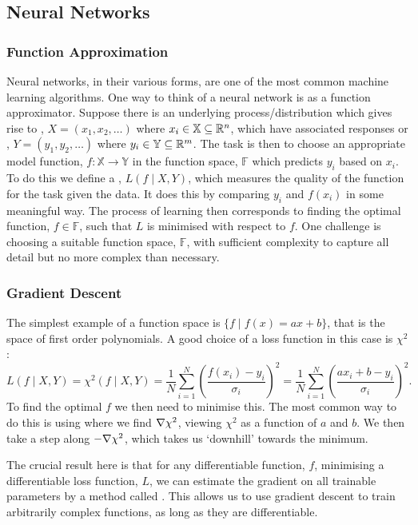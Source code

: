 \documentclass[a4paper]{article}
\newcommand{\st}{\mid}
\begin{document}
    \subsection{Neural Networks}
    \subsubsection{Function Approximation}
    Neural networks, in their various forms, are one of the most common machine learning algorithms.
    One way to think of a neural network is as a function approximator.
    Suppose there is an underlying process/distribution which gives rise to , \(X = (x_1, x_2, \dotsc)\) where \(x_i\in\mathbb{X}\subseteq\mathbb{R}^n\), which have associated responses or , \(Y = (y_1, y_2, \dotsc)\) where \(y_i \in \mathbb{Y} \subseteq \mathbb{R}^m\).
    The task is then to choose an appropriate model function, \(f\colon\mathbb{X} \to \mathbb{Y}\) in the function space, \(\mathbb{F}\) which predicts \(y_i\) based on \(x_i\).
    To do this we define a , \(L(f\st X, Y)\), which measures the quality of the function for the task given the data.
    It does this by comparing \(y_i\) and \(f(x_i)\) in some meaningful way.
    The process of learning then corresponds to finding the optimal function, \(f\in\mathbb{F}\), such that \(L\) is minimised with respect to \(f\).
    One challenge is choosing a suitable function space, \(\mathbb{F}\), with sufficient complexity to capture all detail but no more complex than necessary.
    
    \subsubsection{Gradient Descent}
    The simplest example of a function space is \(\{f\st f(x) = ax + b\}\), that is the space of first order polynomials.
    A good choice of a loss function in this case is \(\chi^2\):
    \[L(f\st X, Y) = \chi^2(f\st X, Y) = \frac{1}{N} \sum_{i = 1}^{N} \left(\frac{f(x_i) - y_i}{\sigma_i}\right)^2 = \frac{1}{N} \sum_{i = 1}^{N} \left(\frac{ax_i + b - y_i}{\sigma_i}\right)^2.\]
    To find the optimal \(f\) we then need to minimise this.
    The most common way to do this is using  where we find \(\nabla\chi^2\), viewing \(\chi^2\) as a function of \(a\) and \(b\).
    We then take a step along \(-\nabla\chi^2\), which takes us `downhill' towards the minimum.
    
    The crucial result here is that for any differentiable function, \(f\), minimising a differentiable loss function, \(L\), we can estimate the gradient on all trainable parameters by a method called .
    This allows us to use gradient descent to train arbitrarily complex functions, as long as they are differentiable.
    
\end{document}
